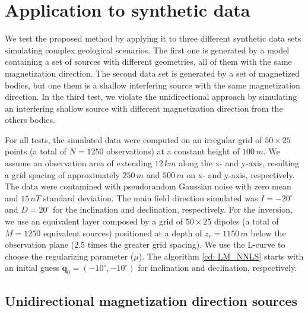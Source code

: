 \section{Application to synthetic data}
\label{sec:synt_tests}

We test the proposed method by applying it to three different synthetic data sets simulating complex geological scenarios. The first one is generated by a model containing a set of sources with different geometries, all of them with the same magnetization direction. The second data set is generated by a set of magnetized bodies, but one them is a shallow interfering source with the same magnetization direction. In the third test, we violate the unidirectional approach by simulating an interfering shallow source with different magnetization direction from the others bodies.

For all tests, the simulated data were computed on an irregular grid of $50 \times 25$ points (a total of $N = 1250$ observations) at a constant height of $100 \, m$.  We assume an observation area of extending $12 \, km$ along the x- and y-axis, resulting a grid spacing of approximately $250 \, m$ and $500 \, m$ on x- and y-axis, respectively. The data were contamined with pseudorandom Gaussian noise with zero mean and $15 \, nT$ standard deviation. The main field direction simulated was $I= -20^\circ$ and $D= 20^\circ$ for the inclination and declination, respectively. For the inversion, we use an equivalent layer composed by a grid of $50 \times 25$ dipoles (a total of $M = 1250$ equivalent sources) positioned at a depth of $z_c = 1150 \, m$ below the observation plane ($2.5$ times the greater grid spacing). We use the L-curve to choose the regularizing parameter ($\mu$). The algorithm \ref{cd: LM_NNLS} starts with an initial guess $\mathbf{q}_0 = (-10^\circ,-10^\circ)$ for inclination and declination, respectively.

\subsection{Unidirectional magnetization direction sources}
 




